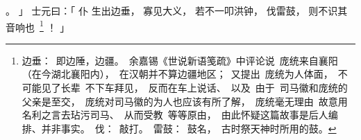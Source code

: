    。
」
士元曰：「
    仆
    生出边垂，
    寡见大义，
    若不一叩洪钟，
    伐雷鼓，
    则不识其音响\mbox{也%
    \footnote{%
        边垂：
            即边陲，边疆。
            余嘉锡《世说新语笺疏》中评论说
            庞统来自襄阳（在今湖北襄阳内），
            在汉朝并不算边疆地区；
            又提出
            庞统为人体面，
            不可能见了长辈
            不下车拜见，
            反而在车上说话、
            以及
            由于
            司马徽和庞统的父亲是至交，
            庞统对司马徽的为人也应该有所了解，
            庞统毫无理由
            故意用名利之言去玷污司马、
            从而受教
            等等原由，
            由此怀疑这篇故事是后人编排、并非事实。
        伐：
            敲打。
        雷鼓：
            鼓名，
            古时祭天神时所用的鼓。
    }}%
    ！
」

\switchcolumn



